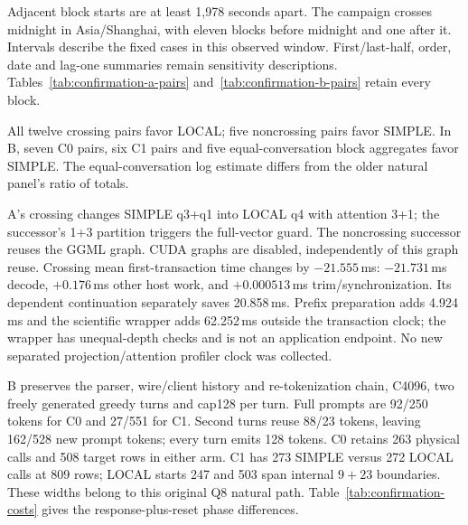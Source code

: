 Adjacent block starts are at least 1,978 seconds apart. The campaign crosses midnight in \mbox{Asia/Shanghai}, with eleven blocks before midnight and one after it. Intervals describe the fixed cases in this observed window. First/last-half, order, date and lag-one summaries remain sensitivity descriptions. Tables~\ref{tab:confirmation-a-pairs} and~\ref{tab:confirmation-b-pairs} retain every block.


All twelve crossing pairs favor LOCAL; five noncrossing pairs favor SIMPLE. In B, seven C0 pairs, six C1 pairs and five equal-conversation block aggregates favor SIMPLE. The equal-conversation log estimate differs from the older natural panel's ratio of totals.

A's crossing changes SIMPLE q3+q1 into LOCAL q4 with attention 3+1; the successor's 1+3 partition triggers the full-vector guard. The noncrossing successor reuses the GGML graph. CUDA graphs are disabled, independently of this graph reuse. Crossing mean first-transaction time changes by $-21.555$\,ms: $-21.731$\,ms decode, $+0.176$\,ms other host work, and $+0.000513$\,ms trim/synchronization. Its dependent continuation separately saves 20.858\,ms. Prefix preparation adds 4.924\,ms and the scientific wrapper adds 62.252\,ms outside the transaction clock; the wrapper has unequal-depth checks and is not an application endpoint. No new separated projection/attention profiler clock was collected.


\begin{samepage}
B preserves the parser, wire/client history and re-tokenization chain, C4096, two freely generated greedy turns and cap128 per turn. Full prompts are 92/250 tokens for C0 and 27/551 for C1. Second turns reuse 88/23 tokens, leaving 162/528 new prompt tokens; every turn emits 128 tokens. C0 retains 263 physical calls and 508 target rows in either arm. C1 has 273 SIMPLE versus 272 LOCAL calls at 809 rows; LOCAL starts 247 and 503 span internal $9+23$ boundaries. These widths belong to this original Q8 natural path. Table~\ref{tab:confirmation-costs} gives the response-plus-reset phase differences.\par
\end{samepage}


